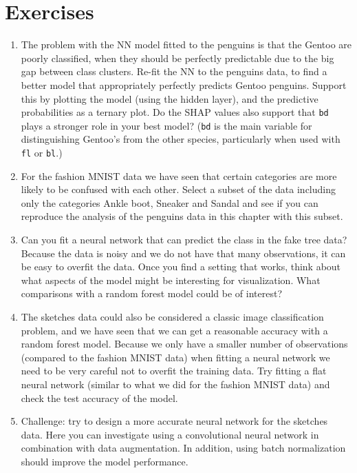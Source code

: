 \documentclass[
  letterpaper,
]{krantz}
\providecommand{\tightlist}{%
  \setlength{\itemsep}{0pt}\setlength{\parskip}{0pt}}\usepackage{longtable,booktabs,array}
\begin{document}
\section*{Exercises}\label{exercises-16}


\begin{enumerate}
\def\labelenumi{\arabic{enumi}.}
\tightlist
\item
  The problem with the NN model fitted to the penguins is that the
  Gentoo are poorly classified, when they should be perfectly
  predictable due to the big gap between class clusters. Re-fit the NN
  to the penguins data, to find a better model that appropriately
  perfectly predicts Gentoo penguins. Support this by plotting the model
  (using the hidden layer), and the predictive probabilities as a
  ternary plot. Do the SHAP values also support that \texttt{bd} plays a
  stronger role in your best model? (\texttt{bd} is the main variable
  for distinguishing Gentoo's from the other species, particularly when
  used with \texttt{fl} or \texttt{bl}.)
\item
  For the fashion MNIST data we have seen that certain categories are
  more likely to be confused with each other. Select a subset of the
  data including only the categories Ankle boot, Sneaker and Sandal and
  see if you can reproduce the analysis of the penguins data in this
  chapter with this subset.
\item
  Can you fit a neural network that can predict the class in the fake
  tree data? Because the data is noisy and we do not have that many
  observations, it can be easy to overfit the data. Once you find a
  setting that works, think about what aspects of the model might be
  interesting for visualization. What comparisons with a random forest
  model could be of interest?
\item
  The sketches data could also be considered a classic image
  classification problem, and we have seen that we can get a reasonable
  accuracy with a random forest model. Because we only have a smaller
  number of observations (compared to the fashion MNIST data) when
  fitting a neural network we need to be very careful not to overfit the
  training data. Try fitting a flat neural network (similar to what we
  did for the fashion MNIST data) and check the test accuracy of the
  model.
\item
  Challenge: try to design a more accurate neural network for the
  sketches data. Here you can investigate using a convolutional neural
  network in combination with data augmentation. In addition, using
  batch normalization should improve the model performance.
\end{enumerate}
\end{document}
